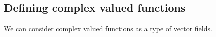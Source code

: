 
\subsection{Defining complex valued functions}

We can consider complex valued functions as a type of vector fields.

